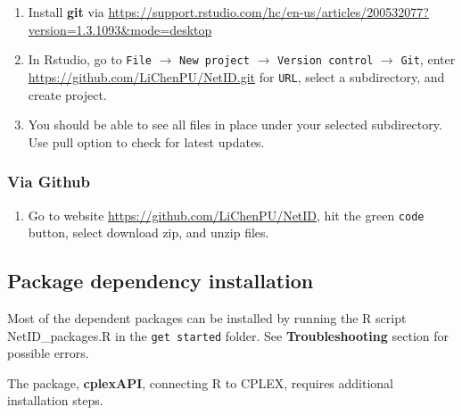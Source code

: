 \documentclass[]{article}
\providecommand{\tightlist}{%
  \setlength{\itemsep}{0pt}\setlength{\parskip}{0pt}}
\begin{document}
\begin{enumerate}
\def\labelenumi{\arabic{enumi}.}
\item
  Install \textbf{git} via \url{https://support.rstudio.com/hc/en-us/articles/200532077?version=1.3.1093\&mode=desktop}
\item
  In Rstudio, go to \texttt{File} \(\rightarrow\) \texttt{New project} \(\rightarrow\) \texttt{Version control} \(\rightarrow\) \texttt{Git}, enter \url{https://github.com/LiChenPU/NetID.git} for \texttt{URL}, select a subdirectory, and create project.
\item
  You should be able to see all files in place under your selected subdirectory. Use pull option to check for latest updates.
\end{enumerate}

\hypertarget{via-github}{%
\subsubsection{Via Github}\label{via-github}}

\begin{enumerate}
\def\labelenumi{\arabic{enumi}.}
\tightlist
\item
  Go to website \url{https://github.com/LiChenPU/NetID}, hit the green \texttt{code} button, select download zip, and unzip files.
\end{enumerate}

\hypertarget{package-dependency-installation}{%
\subsection{Package dependency installation}\label{package-dependency-installation}}

Most of the dependent packages can be installed by running the R script NetID\_packages.R in the \texttt{get started} folder. See \textbf{Troubleshooting} section for possible errors.

The package, \textbf{cplexAPI}, connecting R to CPLEX, requires additional installation steps.
\end{document}
